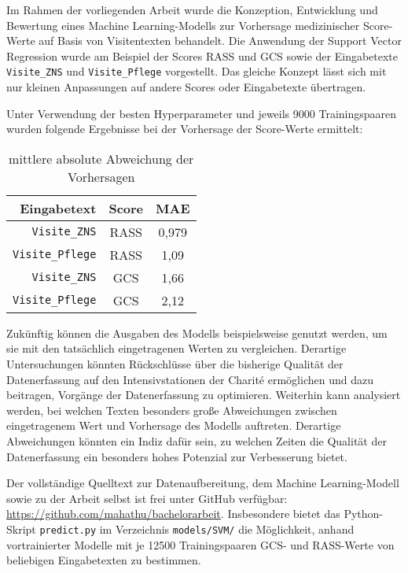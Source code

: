 Im Rahmen der vorliegenden Arbeit wurde die Konzeption, Entwicklung und Bewertung eines Machine Learning-Modells zur Vorhersage medizinischer Score-Werte auf Basis von Visitentexten behandelt. Die Anwendung der Support Vector Regression wurde am Beispiel der Scores RASS und GCS sowie der Eingabetexte \texttt{Visite\_ZNS} und \texttt{Visite\_Pflege} vorgestellt. Das gleiche Konzept lässt sich mit nur kleinen Anpassungen auf andere Scores oder Eingabetexte übertragen.

Unter Verwendung der besten Hyperparameter  und jeweils 9000 Trainingspaaren wurden folgende Ergebnisse bei der Vorhersage der Score-Werte ermittelt:

\begin{table}[h]
    \centering
    \begin{tabular}{rcc}
        Eingabetext
        & Score
        & MAE\\
        \midrule
        \texttt{Visite\_ZNS}    & RASS & 0,979 \\
        \texttt{Visite\_Pflege} & RASS & 1,09 \\
        \texttt{Visite\_ZNS}    & GCS  & 1,66 \\
        \texttt{Visite\_Pflege} & GCS  & 2,12 \\
        \bottomrule
    \end{tabular}
    \caption{mittlere absolute Abweichung der Vorhersagen}
\end{table}

Zukünftig können die Ausgaben des Modells beispielsweise genutzt werden, um sie mit den tatsächlich eingetragenen Werten zu vergleichen. Derartige Untersuchungen könnten Rückschlüsse über die bisherige Qualität der Datenerfassung auf den Intensivstationen der Charité ermöglichen und dazu beitragen, Vorgänge der Datenerfassung zu optimieren. Weiterhin kann analysiert werden, bei welchen Texten besonders große Abweichungen zwischen eingetragenem Wert und Vorhersage des Modells auftreten. Derartige Abweichungen könnten ein Indiz dafür sein, zu welchen Zeiten die Qualität der Datenerfassung ein besonders hohes Potenzial zur Verbesserung bietet.

Der vollständige Quelltext zur Datenaufbereitung, dem Machine Learning-Modell sowie zu der Arbeit selbst ist frei unter GitHub verfügbar: \url{https://github.com/mahathu/bachelorarbeit}. Insbesondere bietet das Python-Skript \texttt{predict.py} im Verzeichnis \texttt{models/SVM/} die Möglichkeit, anhand vortrainierter Modelle mit je 12500 Trainingspaaren GCS- und RASS-Werte von beliebigen Eingabetexten zu bestimmen.